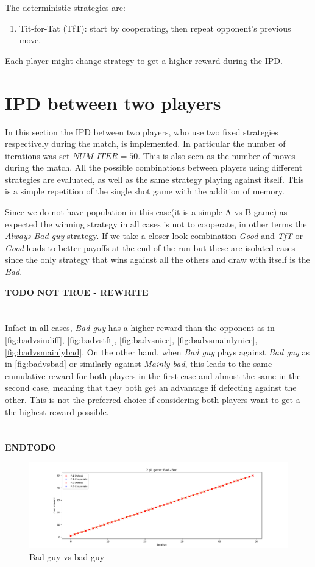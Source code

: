 \documentclass[journal,a4paper,10pt,twoside]{IEEEtran}
\begin{document}
The deterministic strategies are:
\begin{enumerate}
    \item Tit-for-Tat (TfT): start by cooperating, then repeat opponent's previous move.
\end{enumerate}

Each player might change strategy to get a higher reward during the IPD.

\section{IPD between two players} \label{IPD2P}
In this section the IPD between two players, who use two fixed strategies respectively during the match, is implemented.
In particular the number of iterations was set $NUM\_ITER = 50$. This is also seen as the number of moves during the match. All the possible combinations between players using different strategies are evaluated, as well as the same strategy playing against itself. This is a simple repetition of the single shot game with the addition of memory.

Since we do not have population in this case(it is a simple A vs B game) as expected the winning strategy in all cases is not to cooperate, in other terms the \textit{Always Bad guy} strategy. If we take a closer look combination \textit{Good} and \textit{TfT} or \textit{Good} leads to better payoffs at the end of the run but these are isolated cases since the only strategy that wins against all the others and draw with itself is the \textit{Bad}. 

\textbf{TODO NOT TRUE - REWRITE}\\ \\ \\
Infact in all cases, \textit{Bad guy} has a higher reward than the opponent as in \autoref{fig:badvsindiff}, \autoref{fig:badvstft}, \autoref{fig:badvsnice}, \autoref{fig:badvsmainlynice}, \autoref{fig:badvsmainlybad}. 
On the other hand, when \textit{Bad guy} plays against \textit{Bad guy} as in \autoref{fig:badvsbad} or similarly against \textit{Mainly bad}, this leads to the same cumulative reward for both players in the first case and almost the same in the second case, meaning that they both get an advantage if defecting against the other. This is not the preferred choice if considering both players want to get a the highest reward possible.\\ \\ \\
\textbf{ENDTODO}
\begin{figure}
    \centering
    \includegraphics[width=1\columnwidth]{../img_v1/idp2p-rewards-Bad-Bad.png}
    \caption{Bad guy vs bad guy}
    \label{fig:badvsbad}
\end{figure}
\end{document}
